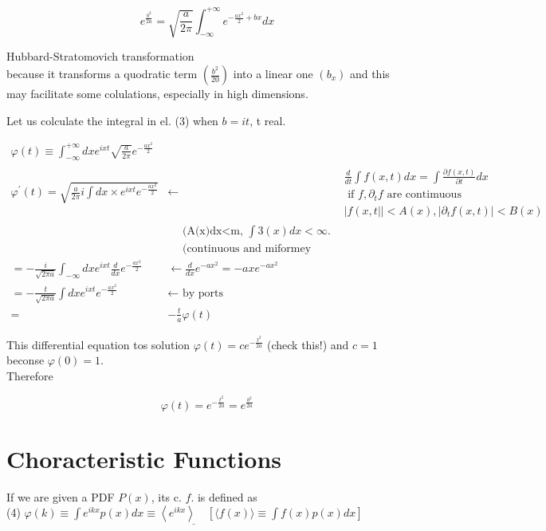 \documentclass[10pt]{article}
\begin{document}
$$
e^{\frac{b^{2}}{2 a}}=\sqrt{\frac{a}{2 \pi}} \int_{-\infty}^{+\infty} e^{-\frac{a x^{2}}{2}+b x} d x
$$

Hubbard-Stratomovich transformation\\
because it transforms a quodratic term $\left(\frac{b^{2}}{20}\right)$ into a linear one $\left(b_{x}\right)$ and this may facilitate some colulations, especially in high dimensions.

Let us colculate the integral in el. (3) when $b=i t$, t real.

$$
\begin{array}{rlrl}
\varphi(t) \equiv \int_{-\infty}^{+\infty} d x e^{i x t} \sqrt{\frac{a}{2 \pi}} e^{-\frac{a x^{2}}{2}} & \\
\varphi^{\prime}(t)=\sqrt{\frac{a}{2 \pi} i \int d x \times e^{i x t} e^{-\frac{a x^{2}}{2}}} & \leftarrow & \begin{array}{c}
\frac{d}{d t} \int f(x, t) d x=\int \frac{\partial f(x, t)}{\partial t} d x \\
\text { if } f, \partial_{t} f \text { are contimuous } \\
\mid f\left(x, t| |<A(x),\left|\partial_{t} f(x, t)\right|<B(x)\right.
\end{array} \\
& \quad \text { (A(x)dx<m, } \int 3(x) d x<\infty . \\
& \quad \text { (continuous and miformey bounded) } \\
=-\frac{i}{\sqrt{2 \pi a}} \int_{-\infty} d x e^{i x t} \frac{d}{d x} e^{-\frac{a x^{2}}{2}} & \leftarrow \frac{d}{d x} e^{-a x^{2}}=-a x e^{-a x^{2}} \\
=-\frac{t}{\sqrt{2 \pi a}} \int d x e^{i x t} e^{-\frac{a x^{2}}{2}} & \leftarrow \text { by ports } \\
= & -\frac{t}{a} \varphi(t)
\end{array}
$$

This differential equation tos solution $\varphi(t)=c e^{-\frac{t^{2}}{2 a}}$ (check this!) and $c=1$ beconse $\varphi(0)=1$.\\
Therefore

$$
\varphi(t)=e^{-\frac{t^{2}}{2 a}}=e^{\frac{b^{2}}{2 a}}
$$

\section*{Choracteristic Functions}
If we are given a PDF $P(x)$, its c. $f$. is defined as\\
(4) $\underline{\varphi(k) \equiv \int e^{i k x} p(x) d x \equiv\left\langle e^{i k x}\right\rangle \quad\left[\langle f(x)\rangle \equiv \int f(x) p(x) d x\right]}$
\end{document}
